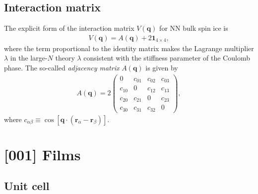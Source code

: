 \documentclass[aps,prx,reprint,runinaddress,superscriptaddress,amsmath,amssymb,floatfix,longbibliography]{revtex4-1}
\renewcommand{\vec}[1]{\boldsymbol{#1}}
\newcommand{\mat}[1]{#1}
\newcommand{\matone}{\vec{1}}
\begin{document}
\subsection{Interaction matrix}

The explicit form of the interaction matrix $\mat{V}(\vec{q})$ for \ac{NN} bulk spin ice is
\begin{align}
	\mat{V}({\vec{q}}) = \mat{A}({\vec{q}}) + 2 \matone_{4 \times 4},
\end{align}
where the term proportional to the identity matrix makes the Lagrange multiplier $\lambda$ in the large-$N$ theory $\lambda$ consistent with the stiffness parameter of the Coulomb phase. The so-called \emph{adjacency matrix} $A(\vec{q})$ is given by
\begin{align}
	\mat{A}(\vec{q}) = 2 
	\begin{pmatrix}
	    0 & c_{01} & c_{02} & c_{03} \\
	    c_{10} & 0 & c_{12} & c_{13} \\
	    c_{20} & c_{21} & 0 & c_{23} \\
	    c_{30} & c_{31} & c_{32} & 0
	\end{pmatrix},
\end{align}
where $c_{\alpha \beta} \equiv \cos[\vec{q} \cdot (\vec{r}_\alpha - \vec{r}_\beta) ]$.

\section{[001] Films}
\label{app:films}

\subsection{Unit cell}
\end{document}
